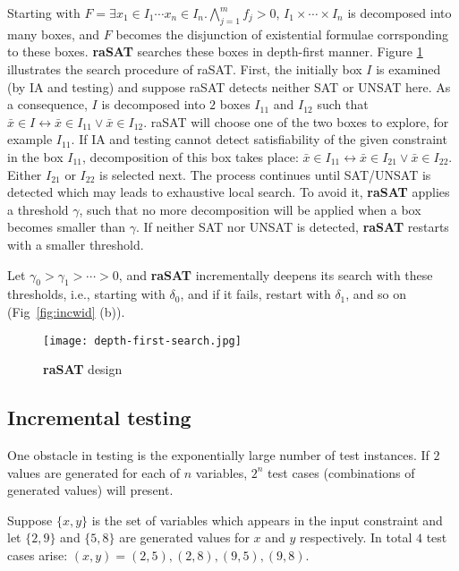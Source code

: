 Starting with $F = \exists x_1 \in I_1 \cdots x_n \in I_n. \bigwedge \limits_{j=1}^m f_j > 0$, 
$I_1 \times \cdots \times I_n$ is decomposed into many boxes, 
and $F$ becomes the disjunction of existential formulae corrsponding to these boxes. 
{\bf raSAT} searches these boxes in depth-first manner. Figure \ref{fig:depth-first-search} illustrates the search procedure of raSAT. First, the initially box $I$ is examined (by IA and testing) and suppose raSAT detects neither SAT or UNSAT here. As a consequence, $I$ is decomposed into $2$ boxes $I_{11}$ and $I_{12}$ such that $\bar{x} \in I \leftrightarrow \bar{x} \in I_{11} \vee \bar{x} \in I_{12}$. raSAT will choose one of the two boxes to explore, for example $I_{11}$. If IA and testing cannot detect satisfiability of the given constraint in the box $I_{11}$, decomposition of this box takes place:  $\bar{x} \in I_{11} \leftrightarrow \bar{x} \in I_{21} \vee \bar{x} \in I_{22}$. Either $I_{21}$ or $I_{22}$ is selected next. The process continues until SAT/UNSAT is detected which may leads to exhaustive local search.
To avoid it, {\bf raSAT} applies a threshold $\gamma$, such that no more decomposition will be 
applied when a box becomes smaller than $\gamma$. 
If neither SAT nor UNSAT is detected, {\bf raSAT} restarts with a smaller threshold. 

Let $\gamma_0 > \gamma_1 > \cdots > 0$, and {\bf raSAT} incrementally deepens its search 
with these thresholds, i.e., starting with $\delta_0$, and if it fails, restart with $\delta_1$, 
and so on (Fig~\ref{fig:incwid} (b)). 

\begin{figure}[ht]
\centering
\texttt{[image: depth-first-search.jpg]} 
\caption{\textbf{raSAT} design} 
\label{fig:depth-first-search} 
\end{figure} 
\subsection{Incremental testing}
One obstacle in testing is the exponentially large number of test instances. If $2$ values are generated for each of $n$ variables, $2^n$ test cases (combinations of generated values) will present. 
\begin{example}
Suppose $\{x, y\}$ is the set of variables which appears in the input constraint and let $\{2, 9\}$ and $\{5, 8\}$ are generated values for $x$ and $y$ respectively. In total $4$ test cases arise: $(x, y) = (2, 5), (2, 8), (9, 5), (9, 8)$.
\end{example}

